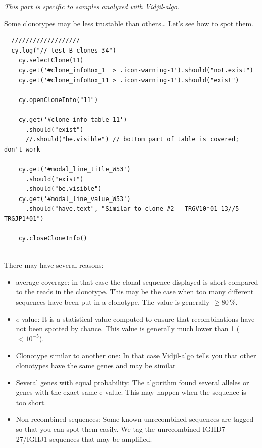 \bigskip

\textit{This part is specific to samples analyzed with Vidjil-algo.}

Some clonotypes may be less trustable than others\dots{} Let's see how to spot them.
\begin{verbatim}
  ///////////////////
  cy.log("// test_B_clones_34")
    cy.selectClone(11)
    cy.get('#clone_infoBox_1  > .icon-warning-1').should("not.exist")
    cy.get('#clone_infoBox_11 > .icon-warning-1').should("exist")

    cy.openCloneInfo("11")

    cy.get('#clone_info_table_11')
      .should("exist")
      //.should("be.visible") // bottom part of table is covered; don't work

    cy.get('#modal_line_title_W53')
      .should("exist")
      .should("be.visible")
    cy.get('#modal_line_value_W53')
      .should("have.text", "Similar to clone #2 - TRGV10*01 13//5 TRGJP1*01")

    cy.closeCloneInfo()


\end{verbatim}

There may have several reasons: 
\begin{itemize}
\item average coverage: in that case the clonal sequence displayed is short
  compared to the reads in the clonotype. This may be the case when too many different
  sequences have been put in a clonotype. The value is generally $\geq 80\,\%$.
\item $e$-value: It is a statistical value computed to ensure that
  recombinations have not been spotted by chance. This value is generally much
  lower than 1 ($<10^{-5}$).
\item Clonotype similar to another one: In that case Vidjil-algo tells you that
  other clonotypes have the same genes and may be similar
\item Several genes with equal probability: The algorithm found several alleles or genes with the exact same e-value. This may happen when the sequence is too short.
\item Non-recombined sequences: Some known unrecombined sequences are tagged
  so that you can spot them easily. We tag the unrecombined IGHD7-27/IGHJ1
  sequences that may be amplified.
\end{itemize}

